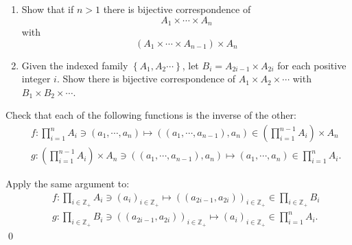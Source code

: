 \documentclass[a4paper,12pt]{article}
\begin{document}
\begin{exe}\leavevmode \par
	\begin{enumerate}
		\item
		      Show that if \( n>1 \)
		      there is bijective correspondence of
		      \begin{equation*}
			      A_1 \times \cdots \times A_n
		      \end{equation*}
		      with
		      \begin{equation*}
			      (A_1 \times \cdots \times A_{n-1})\times A_{n}
		      \end{equation*}
		      
		\item
		      Given the indexed family \( \left\{ A_1, A_2\cdots \right\} \),
		      let \( B_i=A_{2i-1}\times A_{2i} \)
		      for each positive integer \( i \).
		      Show there is bijective correspondence of \( A_1 \times A_2 \times \cdots \)
		      with \( B_1 \times B_2 \times \cdots \).
	\end{enumerate}
\end{exe}\begin{sol}\leavevmode \par
	Check that each of the following functions is the inverse of the other:
	\begin{eqnarray*}
		&&	f:\prod_{i =1}^n A_i \ni (a_1,\cdots,a_n)
		\mapsto ((a_1,\cdots,a_{n-1}),a_n)
		\in \left( \prod_{i =1}^{n-1} A_i \right) \times A_n\\
		&&	g:\left( \prod_{i =1}^{n-1} A_i \right) \times A_n
		\ni ((a_1,\cdots,a_{n-1}),a_n) \mapsto (a_1,\cdots,a_n)
		\in \prod_{i =1}^n A_i.
	\end{eqnarray*}
	
	Apply the same argument to:
	\begin{eqnarray*}
		&&	f:\prod_{i \in \mathbb{Z}_{+}} A_i \ni (a_i)_{i \in \mathbb{Z}_{+}}
		\mapsto ((a_{2i - 1},a_{2i}))_{i \in \mathbb{Z}_{+}}
		\in \prod_{i \in \mathbb{Z}_{+}} B_i \\
		&&	g:\prod_{i \in \mathbb{Z}_{+}} B_i
		\ni ((a_{2i - 1},a_{2i}))_{i \in \mathbb{Z}_{+}}
		\mapsto (a_i)_{i \in \mathbb{Z}_{+}}
		\in \prod_{i =1}^n A_i.
	\end{eqnarray*}
	\qed\end{sol}
\end{document}
